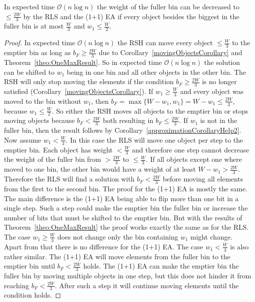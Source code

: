 \begin{lemma}\label{movingObjectsLemma2}
    In expected time $\mathcal{O}(n\log{}n)$ the weight of the fuller bin can be decreased to \(\le \frac{2W}{3}\) by the RLS and the (1+1) EA if every object besides the biggest in the fuller bin is at most $\frac{W}{3}$ and \(w_1 \le \frac{W}{2}\).
\end{lemma}
\begin{proof}
    In expected time $\mathcal{O}(n\log{}n)$ the RSH can move every object $\le \frac{W}{3}$ to the emptier bin as long as $b_F \ge \frac{2W}{3}$ due to Corollary~\ref{movingObjectsCorollary} and Theorem~\ref{theo:OneMaxResult}.
    So in expected time $\mathcal{O}(n\log{}n)$ the solution can be shifted to $w_1$ being in one bin and all other objects in the other bin.
    The RSH will only stop moving the elements if the condition $b_F \ge \frac{2W}{3}$ is no longer satisfied (Corollary~\ref{movingObjectsCorollary}).
    If \(w_1 \ge \frac{W}{3}\) and every object was moved to the bin without $w_1$, then \(b_F = \max\{W-w_1, w_1\} = W-w_1 \le \frac{2W}{3}\), because \(w_1 \le \frac{W}{2}\).
    So either the RSH moves all objects to the emptier bin or stops moving objects because $b_F < \frac{2W}{3}$ both resulting in $b_F \le \frac{2W}{3}$.
    If $w_1$ is not in the fuller bin, then the result follows by Corollary~\ref{approximationCorollaryHelp2}.\newline
    Now assume \(w_1 < \frac{W}{3}\).
    In this case the RLS will move one object per step to the emptier bin.
    Each object has weight $< \frac{W}{3}$ and therefore one step cannot decrease the weight of the fuller bin from $> \frac{2W}{3}$ to $\le \frac{W}{3}$.
    If all objects except one where moved to one bin, the other bin would have a weight of at least \(W-w_1 > \frac{2W}{3}\).
    Therefore the RLS will find a solution with $b_F < \frac{2W}{3}$ before moving all elements from the first to the second bin.\newline
    The proof for the (1+1) EA is mostly the same.
    The main difference is the (1+1) EA being able to flip more than one bit in a single step.
    Such a step could make the emptier bin the fuller bin or increase the number of bits that must be shifted to the emptier bin.
    But with the results of Theorem~\ref{theo:OneMaxResult} the proof works exactly the same as for the RLS.
    The case \(w_1 \ge \frac{W}{3}\) does not change only the bin containing $w_1$ might change.
    Apart from that there is no difference for the (1+1) EA.
    The case $w_1 < \frac{W}{3}$ is also rather similar.
    The (1+1) EA will move elements from the fuller bin to the emptier bin until $b_F < \frac{2W}{3}$ holds. The (1+1) EA can make the emptier bin the fuller bin by moving multiple objects in one step, but this does not hinder it from reaching $b_F < \frac{2W}{3}$. After such a step it will continue moving elements until the condition holds.
\end{proof}

